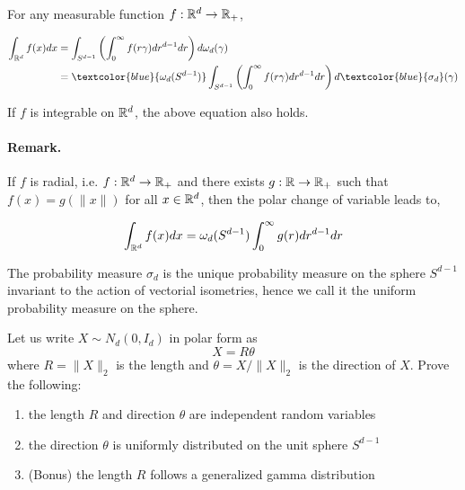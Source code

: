 \documentclass{article}
\begin{document}
\begin{theorem} For any measurable function $f: \mathbb{R}^{d}
  \to \mathbb{R}_+$,

  \begin{equation*}
    \begin{aligned}
      \int_{\R^{d}} f(x) dx &= \int_{S^{d-1}}\left(\int_{0}^{\infty} f(r \gamma) dr^{d-1} d r\right) d
      \omega_d(\gamma)\\ &=  \textcolor{blue}{\omega_d(S^{d-1})} \int_{S^{d-1}}\left(\int_{0}^{\infty} f(r \gamma) dr^{d-1} d r\right) d \textcolor{blue}{\sigma_d}(\gamma)
    \end{aligned}
  \end{equation*}



  If $f$ is integrable on $\mathbb{R}^{d}$, the above equation also holds. 
\end{theorem}

\paragraph{Remark.} If $f$ is radial, i.e. $f: \mathbb{R}^{d}\to \mathbb{R}_+$ and there exists $g: \mathbb{R}
\to \mathbb{R}_+$ such that $f(x) = g(\|x\|)$ for all $x \in \mathbb{R}^{d}$, then the polar change of
variable leads to,

\begin{equation}
  \int_{\mathbb{R}^{d}} f(x) d x= \omega_d(S^{d-1})\int_{0}^{\infty} g(r)dr^{d-1} d r
\end{equation}


\begin{theorem}
  The probability measure $\sigma_{d}$ is the unique probability measure on the sphere
  $S^{d-1}$ invariant to the action of vectorial isometries, hence we call it
  the uniform probability measure on the sphere. 
\end{theorem}

\begin{prop} Let us write $X \sim N_d\left(0, I_{d}\right)$ in
  polar  form as
  $$
  X=R \theta
  $$
  where $R=\|X\|_{2}$ is the length and $\theta=X /\|X\|_{2}$ is the direction
  of $X$. Prove the following:

  \begin{enumerate}
  \item the length $R$ and direction $\theta$ are independent random variables
  \item the direction $\theta$ is uniformly distributed on the unit sphere
    $S^{d-1}$
  \item (Bonus) the length $R$ follows a generalized gamma distribution
  \end{enumerate}
\end{prop}
\end{document}
